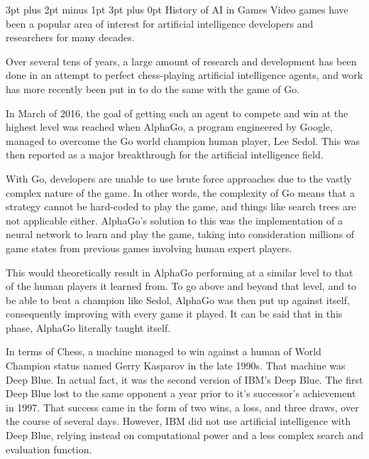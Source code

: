 \documentclass[12pt,a4paper]{article}
\makeatletter
\renewcommand\subsection{\@startsection {subsection}{1}{2mm} %
                               {3pt plus 2pt minus 1pt} %
                               {3pt plus 0pt} %
                               {\normalfont\bfseries}}
\makeatother
\begin{document}
\subsection{History of AI in Games}
Video games have been a popular area of interest for artificial intelligence developers and researchers for many decades. 

Over several tens of years, a large amount of research and development has been done in an attempt to perfect chess-playing artificial intelligence agents\citep{L2PChess}, and work has more recently been put in to do the same with the game of Go.  

In March of 2016, the goal of getting such an agent to compete and win at the highest level was reached when AlphaGo, a program engineered by Google, managed to overcome the Go world champion human player, Lee Sedol\citep{ABriefHistoryOfGameAI}. This was then reported as a major breakthrough for the artificial intelligence field. 

With Go, developers are unable to use brute force approaches due to the vastly complex nature of the game\citep{13}. In other words, the complexity of Go means that a strategy cannot be hard-coded to play the game, and things like search trees are not applicable either. AlphaGo's solution to this was the implementation of a neural network to learn and play the game, taking into consideration millions of game states from previous games involving human expert players. 

This would theoretically result in AlphaGo performing at a similar level to that of the human players it learned from. To go above and beyond that level, and to be able to beat a champion like Sedol, AlphaGo was then put up against itself, consequently improving with every game it played\citep{13}. It can be said that in this phase, AlphaGo literally taught itself. 

In terms of Chess, a machine managed to win against a human of World Champion status named Gerry Kasparov in the late 1990s\citep{14}. That machine was Deep Blue. In actual fact, it was the second version of IBM's Deep Blue. The first Deep Blue lost to the same opponent a year prior to it's successor's achievement in 1997\citep{14}. That success came in the form of two wins, a loss, and three draws\citep{15}, over the course of several days. However, IBM did not use artificial intelligence with Deep Blue, relying instead on computational power and a less complex search and evaluation function\citep{16}. \\
\end{document}
